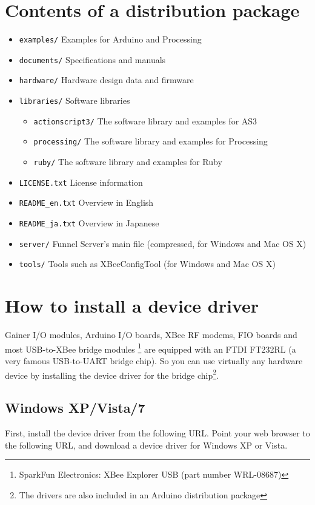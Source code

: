 \documentclass[9pt]{jsarticle}
\begin{document}
\section{Contents of a distribution package}
\begin{itemize}
\item \texttt{examples/} Examples for Arduino and Processing
\item \texttt{documents/} Specifications and manuals
\item \texttt{hardware/} Hardware design data and firmware
\item \texttt{libraries/} Software libraries
	\begin{itemize}
	\item \texttt{actionscript3/} The software library and examples for AS3
	\item \texttt{processing/} The software library and examples for Processing
	\item \texttt{ruby/} The software library and examples for Ruby
	\end{itemize}
\item \texttt{LICENSE.txt} License information
\item \texttt{README\_en.txt} Overview in English
\item \texttt{README\_ja.txt} Overview in Japanese
\item \texttt{server/} Funnel Server's main file (compressed, for Windows and Mac OS X)
\item \texttt{tools/} Tools such as XBeeConfigTool (for Windows and Mac OS X)
\end{itemize}

\section{How to install a device driver}
Gainer I/O modules, Arduino I/O boards, XBee RF modems, FIO boards and most USB-to-XBee bridge modules \footnote{SparkFun Electronics: XBee Explorer USB (part number WRL-08687)} are equipped with an FTDI FT232RL (a very famous USB-to-UART bridge chip). So you can use virtually any hardware device by installing the device driver for the bridge chip\footnote{The drivers are also included in an Arduino distribution package}.

\subsection{Windows XP/Vista/7}
First, install the device driver from the following URL. Point your web browser to the following URL, and download a device driver for Windows XP or Vista.
\end{document}
